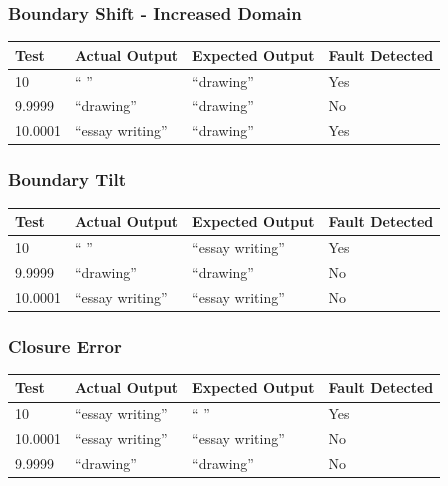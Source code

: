 \documentclass[11pt, oneside]{article}   	%
\begin{document}
\subsubsection{Boundary Shift - Increased Domain}
\begin{table}[!htb]
\centering
\begin{tabular}{|l|l|l|l|}
\hline
Test    & Actual Output   & Expected Output & Fault Detected \\ \hline
10      & “ ”             & “drawing”       & Yes            \\ \hline
9.9999  & “drawing”       & “drawing”       & No             \\ \hline
10.0001 & “essay writing” & “drawing”       & Yes            \\ \hline
\end{tabular}
\end{table}

\subsubsection{Boundary Tilt}
\begin{table}[!htb]
\centering
\begin{tabular}{|l|l|l|l|}
\hline
Test    & Actual Output   & Expected Output & Fault Detected \\ \hline
10      & “ ”             & “essay writing” & Yes            \\ \hline
9.9999  & “drawing”       & “drawing”       & No             \\ \hline
10.0001 & “essay writing” & “essay writing” & No             \\ \hline
\end{tabular}
\end{table}

\subsubsection{Closure Error}
\begin{table}[!htb]
\centering
\begin{tabular}{|l|l|l|l|}
\hline
Test    & Actual Output   & Expected Output & Fault Detected \\ \hline
10      & “essay writing” & “ ”             & Yes            \\ \hline
10.0001 & “essay writing” & “essay writing” & No             \\ \hline
9.9999  & “drawing”       & “drawing”       & No             \\ \hline
\end{tabular}
\end{table}
\newpage
\end{document}
